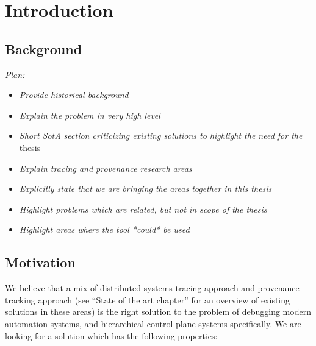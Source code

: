 \newpage %
\section{Introduction}
\subsection*{Background}
\setlength{\parskip}{9.96pt}

\textit{Plan:}
\begin{itemize}
    \item \textit{Provide historical background}
    \item \textit{Explain the problem in very high level}
    \item \textit{Short SotA section criticizing existing solutions to highlight the need for the} thesis
    \item \textit{Explain tracing and provenance research areas}
    \item \textit{Explicitly state that we are bringing the areas together in this thesis}
    \item \textit{Highlight problems which are related, but not in scope of the thesis}
    \item \textit{Highlight areas where the tool *could* be used}
\end{itemize}

\subsection*{Motivation}

\par 

We believe that a mix of distributed systems tracing approach and provenance tracking approach (see “State of the art chapter” for an overview of existing solutions in these areas) is the right solution to the problem of debugging modern automation systems, and hierarchical control plane systems specifically. We are looking for a solution which has the following properties:

